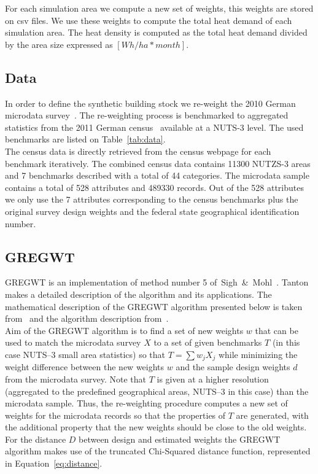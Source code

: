 \documentclass[runningheads,a4paper]{llncs}
\begin{document}
For each simulation area we compute a new set of weights, this weights are
stored on csv files. We use these weights to compute the total heat demand of
each simulation area. The heat density is computed as the total heat demand
divided by the area size expressed as $[Wh/ha*month]$.
\\

\subsection{Data}

In order to define the synthetic building stock we re-weight the 2010 German
microdata survey~\cite{NRW.2010}. The re-weighting process is benchmarked to
aggregated statistics from the 2011 German census~\cite{NRW.2011} available at
a NUTS-3 level. The used benchmarks are listed on Table~\ref{tab:data}.
\\


The census data is directly retrieved from the census webpage for each
benchmark iteratively. The combined census data contains 11300 NUTZS-3 areas and
7 benchmarks described with a total of 44 categories. The microdata sample contains
a total of 528 attributes and 489330 records. Out of the 528 attributes we only
use the 7 attributes corresponding to the census benchmarks plus the original
survey design weights and the federal state geographical identification number.
\\

\subsection{GREGWT}

GREGWT is an implementation of method number 5
of~Sigh~\&~Mohl~\cite{SinghMohl.1996}. Tanton~\cite{Tanton.2011a} makes a
detailed description of the algorithm and its applications. The mathematical
description of the GREGWT algorithm presented below is taken
from~\cite{Rahman.2010} and the algorithm description
from~\cite{MunozH.2015.IMA.GREGWT}.
\\

Aim of the GREGWT algorithm is to find a set of new weights $w$ that can be
used to match the microdata survey $X$ to a set of given benchmarks $T$ (in
this case NUTS--3 small area statistics) so that $T = \sum w_{j} X_{j}$ while
minimizing the weight difference between the new weights $w$ and the sample
design weights $d$ from the microdata survey.
%
Note that $T$ is given at a higher resolution (aggregated to the predefined
geographical areas, NUTS--3 in this case) than the microdata sample.
Thus, the re-weighting procedure computes a new set of weights for 
the microdata records so that the properties of $T$ are generated, with the
additional property that the new weights should be
close to the old weights.
%
For the distance $D$ between design and estimated weights the GREGWT algorithm
makes use of the truncated Chi-Squared distance function, represented in
Equation~\ref{eq:distance}.
\\
\end{document}
